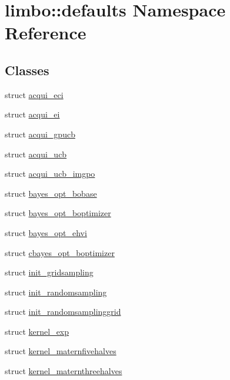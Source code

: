 \hypertarget{namespacelimbo_1_1defaults}{}\section{limbo\+:\+:defaults Namespace Reference}
\label{namespacelimbo_1_1defaults}
\subsection*{Classes}
\begin{DoxyCompactItemize}
\item 
struct \hyperlink{structlimbo_1_1defaults_1_1acqui__eci}{acqui\+\_\+eci}
\item 
struct \hyperlink{structlimbo_1_1defaults_1_1acqui__ei}{acqui\+\_\+ei}
\item 
struct \hyperlink{structlimbo_1_1defaults_1_1acqui__gpucb}{acqui\+\_\+gpucb}
\item 
struct \hyperlink{structlimbo_1_1defaults_1_1acqui__ucb}{acqui\+\_\+ucb}
\item 
struct \hyperlink{structlimbo_1_1defaults_1_1acqui__ucb__imgpo}{acqui\+\_\+ucb\+\_\+imgpo}
\item 
struct \hyperlink{structlimbo_1_1defaults_1_1bayes__opt__bobase}{bayes\+\_\+opt\+\_\+bobase}
\item 
struct \hyperlink{structlimbo_1_1defaults_1_1bayes__opt__boptimizer}{bayes\+\_\+opt\+\_\+boptimizer}
\item 
struct \hyperlink{structlimbo_1_1defaults_1_1bayes__opt__ehvi}{bayes\+\_\+opt\+\_\+ehvi}
\item 
struct \hyperlink{structlimbo_1_1defaults_1_1cbayes__opt__boptimizer}{cbayes\+\_\+opt\+\_\+boptimizer}
\item 
struct \hyperlink{structlimbo_1_1defaults_1_1init__gridsampling}{init\+\_\+gridsampling}
\item 
struct \hyperlink{structlimbo_1_1defaults_1_1init__randomsampling}{init\+\_\+randomsampling}
\item 
struct \hyperlink{structlimbo_1_1defaults_1_1init__randomsamplinggrid}{init\+\_\+randomsamplinggrid}
\item 
struct \hyperlink{structlimbo_1_1defaults_1_1kernel__exp}{kernel\+\_\+exp}
\item 
struct \hyperlink{structlimbo_1_1defaults_1_1kernel__maternfivehalves}{kernel\+\_\+maternfivehalves}
\item 
struct \hyperlink{structlimbo_1_1defaults_1_1kernel__maternthreehalves}{kernel\+\_\+maternthreehalves}

\end{DoxyCompactItemize}
